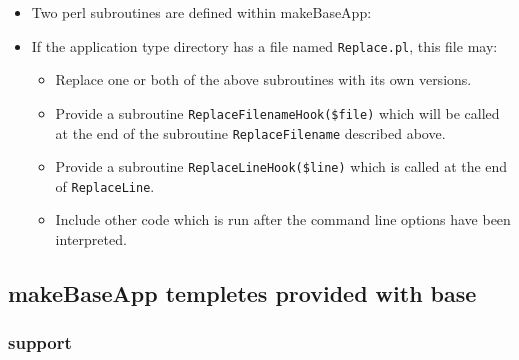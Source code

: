 \begin{itemize}
\item Two perl subroutines are defined within makeBaseApp:


\item If the application type directory has a file named \verb|Replace.pl|, this file may:

\begin{itemize}
\item Replace one or both of the above subroutines with its own versions.

\item Provide a subroutine \verb|ReplaceFilenameHook($file)| which will be called at the end of the subroutine \verb|ReplaceFilename| described above.

\item Provide a subroutine \verb|ReplaceLineHook($line)| which is called at the end of \verb|ReplaceLine|.

\item Include other code which is run after the command line options have been interpreted.
\end{itemize}
\end{itemize}


\subsection{makeBaseApp templetes provided with base}

\subsubsection{support}

